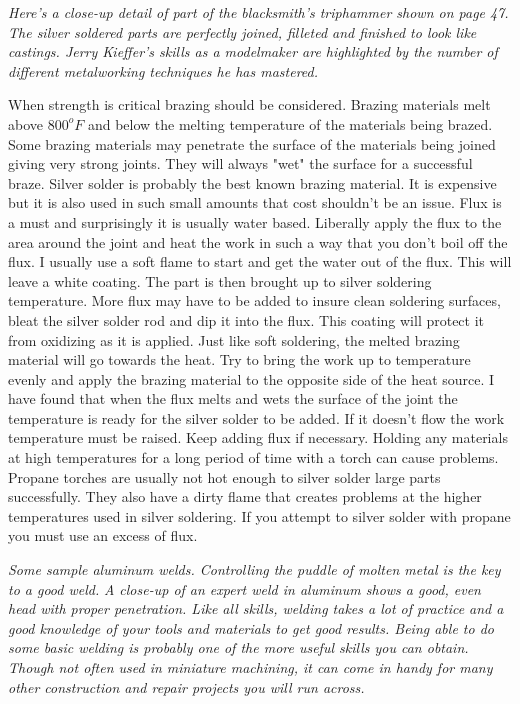 \bigskip
\textit{Here's a close-up detail of part of the blacksmith's triphammer shown on
page 47. The silver soldered parts are perfectly joined, filleted and finished
to look like castings. Jerry Kieffer's skills as a modelmaker are highlighted by
the number of different metalworking techniques he has mastered.}
\bigskip


When strength is critical brazing should be considered. Brazing materials melt
above $800^{o}F$ and below the melting temperature of the materials being
brazed. Some brazing materials may penetrate the surface of the materials being
joined giving very strong joints. They will always "wet" the surface for a
successful braze. Silver solder is probably the best known brazing material. It
is expensive but it is also used in such small amounts that cost shouldn't be an
issue. Flux is a must and surprisingly it is usually water based. Liberally
apply the flux to the area around the joint and heat the work in such a way that
you don't boil off the flux. I usually use a soft flame to start and get the
water out of the flux. This will leave a white coating. The part is then brought
up to silver soldering temperature. More flux may have to be added to insure
clean soldering surfaces, bleat the silver solder rod and dip it into the flux.
This coating will protect it from oxidizing as it is applied. Just like soft
soldering, the melted brazing material will go towards the heat. Try to bring
the work up to temperature evenly and apply the brazing material to the opposite
side of the heat source. I have found that when the flux melts and wets the
surface of the joint the temperature is ready for the silver solder to be added.
If it doesn't flow the work temperature must be raised. Keep adding flux if
necessary. Holding any materials at high temperatures for a long period of time
with a torch can cause problems. Propane torches are usually not hot enough to
silver solder large parts successfully. They also have a dirty flame that
creates problems at the higher temperatures used in silver soldering. If you
attempt to silver solder with propane you must use an excess of flux.

\bigskip
\textit{Some sample aluminum welds. Controlling the puddle of molten metal is
the key to a good weld.}
\bigskip
\textit{A close-up of an expert weld in aluminum shows a good, even head with
proper penetration. Like all skills, welding takes a lot of practice and a good
knowledge of your tools and materials to get good results. Being able to do some
basic welding is probably one of the more useful skills you can obtain. Though
not often used in miniature machining, it can come in handy for many other
construction and repair projects you will run across.}
\bigskip

